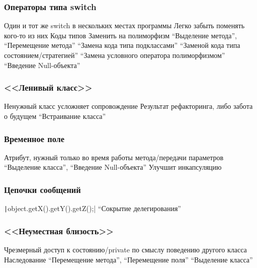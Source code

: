 \documentclass{../../slides-style}
\begin{document}
    \begin{frame}
        \frametitle{Операторы типа switch}
        \begin{outline}
            \1 Один и тот же switch в нескольких местах программы
                \2 Легко забыть поменять кого-то из них
            \1 Коды типов
            \1 Заменить на полиморфизм
                \2 ``Выделение метода'', ``Перемещение метода''
                \2 ``Замена кода типа подклассами''
                \2 ``Заменой кода типа состоянием/стратегией''
                \2 ``Замена условного оператора полиморфизмом''
                \2 ``Введение Null-объекта''
        \end{outline}
    \end{frame}

    \begin{frame}
        \frametitle{<<Ленивый класс>>}
        \begin{outline}
            \1 Ненужный класс усложняет сопровождение
            \1 Результат рефакторинга, либо забота о будущем
            \1 ``Встраивание класса''
        \end{outline}
    \end{frame}

    \begin{frame}
        \frametitle{Временное поле}
        \begin{outline}
            \1 Атрибут, нужный только во время работы метода/передачи параметров
            \1 ``Выделение класса'', ``Введение Null-объекта''
                \2 Улучшит инкапсуляцию
        \end{outline}
    \end{frame}

    \begin{frame}[fragile]
        \frametitle{Цепочки сообщений}
        \begin{outline}
            \1 \texttt|object.getX().getY().getZ();|
            \1 ``Сокрытие делегирования''
        \end{outline}
    \end{frame}

    \begin{frame}
        \frametitle{<<Неуместная близость>>}
        \begin{outline}
            \1 Чрезмерный доступ к состоянию/private по смыслу поведению другого класса
            \1 Наследование
            \1 ``Перемещение метода'', ``Перемещение поля''
            \1 ``Выделение класса''
        \end{outline}
    \end{frame}
\end{document}
